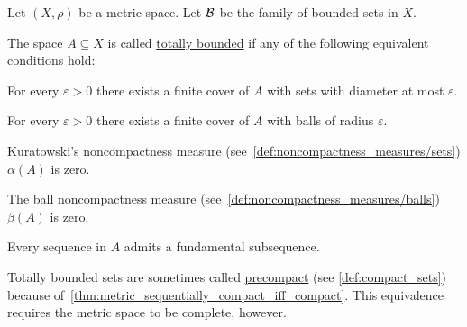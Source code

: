 Let $(X, \rho)$ be a metric space. Let $\mathcal{B}$ be the family of bounded sets in $X$.

\begin{definition}\label{def:totally_bounded_set}
  The space $A \subseteq X$ is called \uline{totally bounded} if any of the following equivalent conditions hold:

  \begin{defenum}
    \item\label{def:totally_bounded_set/sets} For every $\varepsilon > 0$ there exists a finite cover of $A$ with sets with diameter at most $\varepsilon$.
    \item\label{def:totally_bounded_set/balls} For every $\varepsilon > 0$ there exists a finite cover of $A$ with balls of radius $\varepsilon$.
    \item\label{def:totally_bounded_set/zero_noncompactness/sets} Kuratowski's noncompactness measure (see~\cref{def:noncompactness_measures/sets}) $\alpha(A)$ is zero.
    \item\label{def:totally_bounded_set/zero_noncompactness/balls} The ball noncompactness measure (see~\cref{def:noncompactness_measures/balls}) $\beta(A)$ is zero.
    \item\label{def:totally_bounded_set/fundamental_subsequences} Every sequence in $A$ admits a fundamental subsequence.
  \end{defenum}

  Totally bounded sets are sometimes called \uline{precompact} (see \cref{def:compact_sets}) because of~\cref{thm:metric_sequentially_compact_iff_compact}. This equivalence requires the metric space to be complete, however.
\end{definition}
